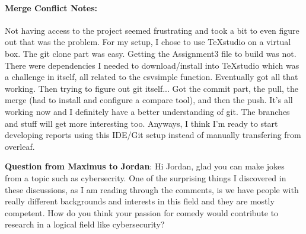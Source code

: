 	\paragraph*{\textbf{Merge Conflict Notes:}}
	
	
	Not having access to the project seemed frustrating and took a bit to even figure out that was the problem. For my setup, I chose to use TeXstudio on a virtual box. The git clone part was easy. Getting the Assignment3 file to build was not. There were dependencies I needed to download/install into TeXstudio which was a challenge in itself, all related to the csvsimple function. Eventually got all that working. Then trying to figure out git itself... Got the commit part, the pull, the merge (had to install and configure a compare tool), and then the push. It's all working now and I definitely have a better understanding of git. The branches and stuff will get more interesting too. Anyways, I think I'm ready to start developing reports using this IDE/Git setup instead of manually transfering from overleaf.
		
	
%

\textbf{Question from Maximus to Jordan}: Hi Jordan, glad you can make jokes from a topic such as cybersecrity. One of the surprising things I discovered in these discussions, as I am reading through the comments, is we have people with really different backgrounds and interests in this field and they are mostly competent. How do you think your passion for comedy would contribute to research in a logical field like cybersecurity?
